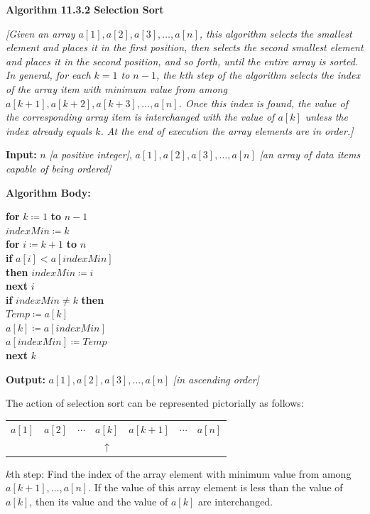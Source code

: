 \documentclass[14pt]{extarticle}
\newcommand{\ua}{\uparrow}
\newcommand{\cy}{\color{cyan}}
\begin{document}
\begin{tcolorbox}[colframe=cyan]
{\bf \cy Algorithm 11.3.2 Selection Sort}

{\it [Given an array \(a[1], a[2], a[3], \ldots, a[n]\), this algorithm selects the smallest element and places it in the 
first position, then selects the second smallest element and places it in the second position, and so forth, until the 
entire array is sorted. In general, for each \(k = 1\) to \(n - 1\), the \(k\)th step of the algorithm selects the index of 
the array item with minimum value from among \(a[k + 1], a[k + 2], a[k + 3], \ldots, a[n]\). Once this index is found, the 
value of the corresponding array item is interchanged with the value of \(a[k]\) unless the index already equals \(k\). At 
the end of execution the array elements are in order.]}

{\bf Input:} \(n\) {\it [a positive integer]}, \(a[1], a[2], a[3], \ldots, a[n]\) {\it [an array of data items capable of 
being ordered]}

{\bf Algorithm Body:} 
\begin{tabbing}
{\bf for} \= \(k \coloneqq 1\) {\bf to} \(n-1\) \\
          \> \(indexMin \coloneqq k\) \\
          \> {\bf for} \= \(i \coloneqq k+1\) {\bf to} \(n\)\\
          \>           \> {\bf if} \(a[i] < a[indexMin]\) \\
          \>           \> {\bf then} \(indexMin\coloneqq i\)\\
          \> {\bf next} \(i\) \\
          \> {\bf if} \(indexMin \neq k\) {\bf then} \\
          \>           \> \(Temp \coloneqq a[k]\) \\
          \>           \> \(a[k] \coloneqq a[indexMin]\) \\
          \>           \> \(a[indexMin] \coloneqq Temp\) \\
{\bf next} \(k\)
\end{tabbing}

{\bf Output:} \(a[1], a[2], a[3], \ldots, a[n]\) {\it [in ascending order]}

The action of selection sort can be represented pictorially as follows:

\begin{tabular}{ccccccc}
\(a[1]\) & \(a[2]\) & \(\cdots\) & \(\boxed{a[k]}\) & \(a[k+1]\) & \(\cdots\) & \(a[n]\) \\
&&&{\cy \(\ua\)}&&&
\end{tabular}

{\cy \(k\)th step: Find the index of the array element with minimum value from among \(a[k + 1], \ldots, a[n]\). If the 
value of this array element is less than the value of \(a[k]\), then its value and the value of \(a[k]\) are 
interchanged.}
\end{tcolorbox}
\end{document}
